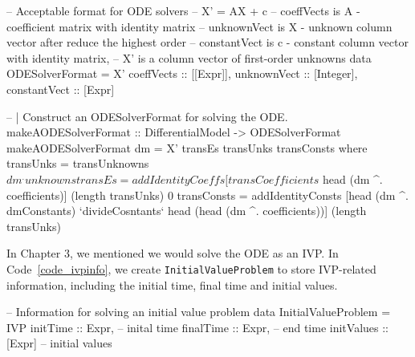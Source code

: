 \begin{listing}
\begin{haskell1}
-- Acceptable format for ODE solvers
-- X' = AX + c
-- coeffVects is A - coefficient matrix with identity matrix
-- unknownVect is X - unknown column vector after reduce the highest order
-- constantVect is c - constant column vector with identity matrix, 
-- X' is a column vector of first-order unknowns
data ODESolverFormat = X'{
  coeffVects :: [[Expr]],
  unknownVect :: [Integer],
  constantVect :: [Expr]
}

-- | Construct an ODESolverFormat for solving the ODE.
makeAODESolverFormat :: DifferentialModel -> ODESolverFormat
makeAODESolverFormat dm = X' transEs transUnks transConsts
  where transUnks = transUnknowns $ dm ^. unknowns
        transEs = addIdentityCoeffs [transCoefficients $ head (dm ^. coefficients)] (length transUnks) 0
        transConsts = addIdentityConsts [head (dm ^. dmConstants) `divideCosntants` head (head (dm ^. coefficients))] (length transUnks)
\end{haskell1}
\label{code_odesolverformat}
\end{listing}

In Chapter 3, we mentioned we would solve the ODE as an IVP. In Code~\ref{code_ivpinfo}, we create \verb|InitialValueProblem| to store IVP-related information, including the initial time, final time and initial values.
\begin{listing}
\begin{haskell1}
-- Information for solving an initial value problem
data InitialValueProblem = IVP{
  initTime :: Expr, -- inital time
  finalTime :: Expr, -- end time
  initValues :: [Expr] -- initial values
}
\end{haskell1}
\label{code_ivpinfo}
\end{listing}

